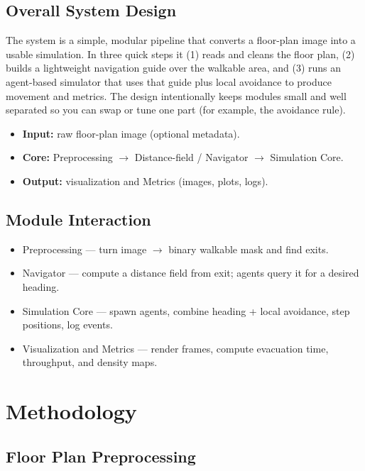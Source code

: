 \documentclass[conference]{IEEEtran}
\begin{document}
\subsection{Overall System Design}

The system is a simple, modular pipeline that converts a floor-plan image into
a usable simulation. In three quick steps it (1) reads and cleans the floor
plan, (2) builds a lightweight navigation guide over the walkable area, and (3)
runs an agent-based simulator that uses that guide plus local avoidance to
produce movement and metrics. The design intentionally keeps modules small and
well separated so you can swap or tune one part (for example, the avoidance
rule).

\begin{itemize}
    \item \textbf{Input:} raw floor-plan image (optional metadata).
    \item \textbf{Core:} Preprocessing $\to$ Distance-field / Navigator $\to$ Simulation Core.
    \item \textbf{Output:} visualization and Metrics (images, plots, logs).
\end{itemize}

\subsection{Module Interaction}

\begin{itemize}
    \item Preprocessing --- turn image $\to$ binary walkable mask and find exits.
    \item Navigator --- compute a distance field from exit; agents query it for a desired
          heading.
    \item Simulation Core --- spawn agents, combine heading + local avoidance, step
          positions, log events.
    \item Visualization and Metrics --- render frames, compute evacuation time,
          throughput, and density maps.
\end{itemize}

\section{Methodology}

\subsection{\textbf{Floor Plan Preprocessing}}
\end{document}
